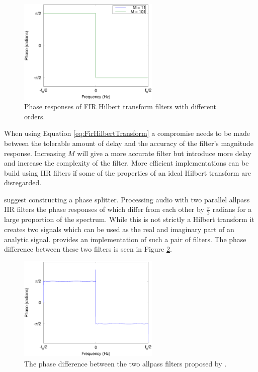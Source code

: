 		\begin{figure}[h!]
			\centering
			\includegraphics[width=0.6\textwidth]{chapter3/Images/HilbertPhaseResponses.eps}
			\caption{Phase responses of FIR Hilbert transform filters with different orders.}
			\label{fig:HilbertPhase}
		\end{figure}

		When using Equation \ref{eq:FirHilbertTransform} a compromise needs to be made between the tolerable amount
		of delay and the accuracy of the filter's magnitude response. Increasing $M$ will give a more accurate
		filter but introduce more delay and increase the complexity of the filter. More efficient implementations
		can be build using IIR filters if some of the properties of an ideal Hilbert transform are disregarded.

		\citet{oppenheim2014discrete} suggest constructing a phase splitter. Processing audio with two parallel
		allpass IIR filters the phase responses of which differ from each other by $\frac{\pi}{2}$ radians for a
		large proportion of the spectrum. While this is not strictly a Hilbert transform it creates two signals
		which can be used as the real and imaginary part of an analytic signal. \citet{niemitalo2003hilbert}
		provides an implementation of such a pair of filters. The phase difference between these two filters is
		seen in Figure \ref{fig:IIRHilbertPhase}.

		\begin{figure}[h!]
			\centering
			\includegraphics[width=0.6\textwidth]{chapter3/Images/IIRHilbertPhaseResponses.eps}
			\caption{The phase difference between the two allpass filters proposed by
			         \citet{niemitalo2003hilbert}.}
			\label{fig:IIRHilbertPhase}
		\end{figure}

